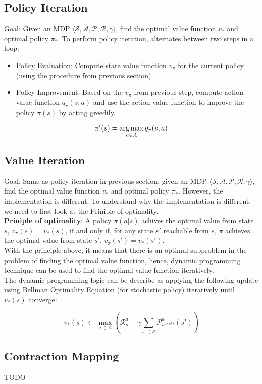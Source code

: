 \subsection{Policy Iteration}

Goal: Given an MDP $\langle \mathcal{S}, \mathcal{A}, \mathcal{P}, \mathcal{R},
    \gamma \rangle$, find the optimal value function $v_*$ and optimal policy
$\pi_*$. To perform policy iteration, alternates between two steps in a loop:

\begin{itemize}
    \item Policy Evaluation: Compute state value function $v_\pi$ for the current policy
          (using the procedure from previous section)
    \item Policy Improvement: Based on the $v_\pi$ from previous step, compute action
          value function $q_\pi(s, a)$ and use the action value function to improve the
          policy $\pi(s)$ by acting greedily.
\end{itemize}

\[
    \pi^\prime(s) = \operatorname*{arg\,max}_{a \in A} q_\pi(s, a)
\]

\subsection{Value Iteration}

Goal: Same as policy iteration in previous section, given an MDP $\langle
    \mathcal{S}, \mathcal{A}, \mathcal{P}, \mathcal{R}, \gamma \rangle$, find the
optimal value function $v_*$ and optimal policy $\pi_*$. However, the
implementation is different. To understand why the implementation is different,
we need to first look at the Priniple of optimality. \\

\noindent \textbf{Priniple of optimality}: A policy $\pi(a|s)$ achives the
optimal value from state $s$, $v_\pi(s) = v_*(s)$, if and only if, for any
state $s\prime$ reachable from $s$, $\pi$ achieves the optimal value from
state $s\prime$, $v_\pi(s\prime)=v_*(s\prime)$. \\

\noindent With the principle above, it means that there is an optimal subproblem in the
problem of finding the optimal value function, hence, dynamic programming
technique can be used to find the optimal value function iteratively. \\

\noindent The dynamic programming logic can be describe as applying the following update
using Bellman Optimality Equation (for stochastic policy) iteratively until $v_*(s)$
converge:

\[
    v_*(s) \leftarrow \max_{a \in \mathcal{A}} \left( \mathcal{R}_s^a +\gamma \sum_{s\prime \in \mathcal{S}} \mathcal{P}_{ss\prime}^a v_*(s\prime) \right)
\]

\subsection{Contraction Mapping}

TODO
